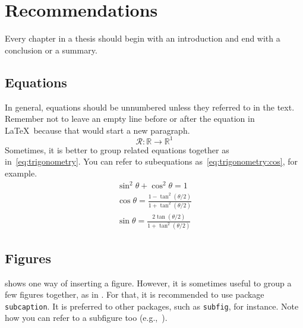 \chapter{Recommendations}

Every chapter in a thesis should begin with an introduction and end with a conclusion or a summary.


\section{Equations}

In general, equations should be unnumbered unless they referred to in the text. Remember not to leave an empty line before or after the equation in \LaTeX\ because that would start a new paragraph.
%
\begin{equation*}
   \mathcal{R} : \mathbb{R} \to \mathbb{R}^1
\end{equation*}
%
Sometimes, it is better to group related equations together as in~\eqref{eq:trigonometry}. You can refer to subequations as~\eqref{eq:trigonometry:cos}, for example. 
%
\begin{subequations}
  \label{eq:trigonometry}
  \begin{gather}
    \sin^2{\theta} + \cos^2{\theta} = 1  \label{eq:trigonometry:sum}\\
    \cos \theta = \frac{1 - \tan^2(\theta/2)}{1 + \tan^2(\theta/2)}   \label{eq:trigonometry:cos}\\
    \sin \theta = \frac{2 \tan(\theta/2)}{1 + \tan^2(\theta/2)}   \label{eq:trigonometry:sin}
  \end{gather}
\end{subequations}




\section{Figures}

 shows one way of inserting a figure. However, it is sometimes useful to group a few figures together, as in . For that, it is recommended to use package \texttt{subcaption}. It is preferred to other packages, such as \texttt{subfig}, for instance. Note how you can refer to a subfigure too (e.g.,~).

